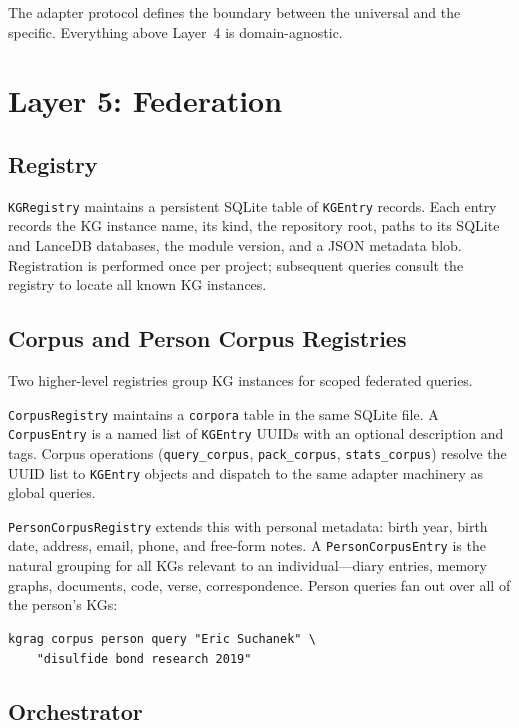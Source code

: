 \documentclass[10pt]{article}
\begin{document}
The adapter protocol defines the boundary between the universal and the
specific. Everything above Layer~4 is domain-agnostic.

\section{Layer 5: Federation}

\subsection{Registry}

\texttt{KGRegistry} maintains a persistent SQLite table of \texttt{KGEntry}
records. Each entry records the KG instance name, its kind, the repository
root, paths to its SQLite and LanceDB databases, the module version, and a
JSON metadata blob. Registration is performed once per project; subsequent
queries consult the registry to locate all known KG instances.

\subsection{Corpus and Person Corpus Registries}

Two higher-level registries group KG instances for scoped federated queries.

\texttt{CorpusRegistry} maintains a \texttt{corpora} table in the same SQLite
file. A \texttt{CorpusEntry} is a named list of \texttt{KGEntry} UUIDs with an
optional description and tags. Corpus operations (\texttt{query\_corpus},
\texttt{pack\_corpus}, \texttt{stats\_corpus}) resolve the UUID list to
\texttt{KGEntry} objects and dispatch to the same adapter machinery as
global queries.

\texttt{PersonCorpusRegistry} extends this with personal metadata: birth year,
birth date, address, email, phone, and free-form notes. A
\texttt{PersonCorpusEntry} is the natural grouping for all KGs relevant to an
individual---diary entries, memory graphs, documents, code, verse, correspondence.
Person queries fan out over all of the person's KGs:

\begin{lstlisting}
kgrag corpus person query "Eric Suchanek" \
    "disulfide bond research 2019"
\end{lstlisting}

\subsection{Orchestrator}
\end{document}
